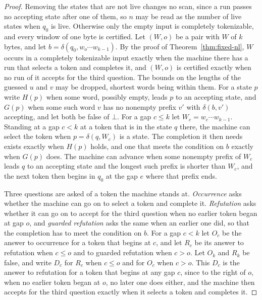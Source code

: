 \documentclass[11pt,a4paper]{article}
\theoremstyle{definition}
\theoremstyle{plain}
\begin{document}
\begin{proof}
Removing the states that are not live changes no scan, since a run passes no accepting state after one of them, so $n$
may be read as the number of live states when $q_0$ is live. Otherwise only the empty input is completely tokenizable,
and every window of one byte is certified. Let $(W, o)$ be a pair with $W$ of $k$ bytes, and let
$b = \delta(q_0, w_o \cdots w_{k-1})$. By the proof of Theorem~\ref{thm:fixed-nl}, $W$ occurs in a completely
tokenizable input exactly when the machine there has a run that selects a token and completes it, and $(W, o)$ is
certified exactly when no run of it accepts for the third question. The bounds on the lengths of the guessed $u$ and $v$
may be dropped, shortest words being within them. For a state $p$ write $H(p)$ when some word, possibly empty, leads $p$
to an accepting state, and $G(p)$ when some such word $v$ has no nonempty prefix $v'$ with $\delta(b, v')$ accepting,
and let both be false of $\bot$. For a gap $c \leq k$ let $W_c = w_c \cdots w_{k-1}$. Standing at a gap $c < k$ at a
token that is in the state $q$ there, the machine can select the token when $p = \delta(q, W_c)$ is a state. The
completion it then needs exists exactly when $H(p)$ holds, and one that meets the condition on $b$ exactly when $G(p)$
does. The machine can advance when some nonempty prefix of $W_c$ leads $q$ to an accepting state and the longest such
prefix is shorter than $W_c$, and the next token then begins in $q_0$ at the gap $e$ where that prefix ends.

Three questions are asked of a token the machine stands at. \emph{Occurrence} asks whether the machine can go on to
select a token and complete it. \emph{Refutation} asks whether it can go on to accept for the third question when no
earlier token began at gap $o$, and \emph{guarded refutation} asks the same when an earlier one did, so that the
completion has to meet the condition on $b$. For a gap $c < k$ let $O_c$ be the answer to occurrence for a token that
begins at $c$, and let $R_c$ be its answer to refutation when $c \leq o$ and to guarded refutation when $c > o$. Let
$O_k$ and $R_k$ be false, and write $D_c$ for $R_c$ when $c \leq o$ and for $O_c$ when $c > o$. This $D_c$ is the answer
to refutation for a token that begins at any gap $c$, since to the right of $o$, when no earlier token began at $o$, no
later one does either, and the machine then accepts for the third question exactly when it selects a token and completes
it.


\end{proof}
\end{document}

